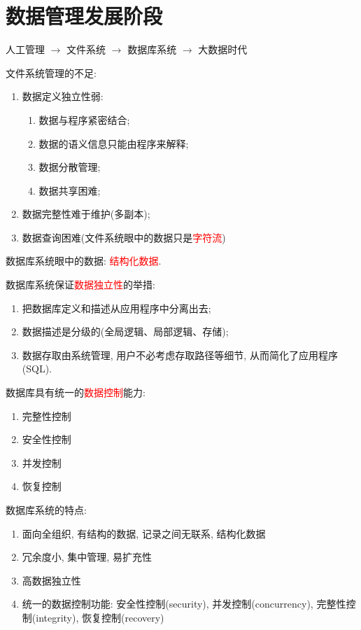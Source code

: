 \section{数据管理发展阶段}

人工管理 $\to$ 文件系统 $\to$ 数据库系统 $\to$ 大数据时代

文件系统管理的不足:
\begin{enumerate}
    \item 数据定义独立性弱:
    \begin{enumerate}
        \item 数据与程序紧密结合;
        \item 数据的语义信息只能由程序来解释;
        \item 数据分散管理;
        \item 数据共享困难;
    \end{enumerate}
    \item 数据完整性难于维护(多副本);
    \item 数据查询困难(文件系统眼中的数据只是\textcolor{red}{字符流})
\end{enumerate}

数据库系统眼中的数据: \textcolor{red}{结构化数据}.

数据库系统保证\textcolor{red}{数据独立性}的举措:
\begin{enumerate}
    \item 把数据库定义和描述从应用程序中分离出去;
    \item 数据描述是分级的(全局逻辑、局部逻辑、存储);
    \item 数据存取由系统管理, 用户不必考虑存取路径等细节, 从而简化了应用程序(SQL).
\end{enumerate}

数据库具有统一的\textcolor{red}{数据控制}能力:
\begin{enumerate}
    \item 完整性控制
    \item 安全性控制
    \item 并发控制
    \item 恢复控制
\end{enumerate}

数据库系统的特点:
\begin{enumerate}
    \item 面向全组织, 有结构的数据, 记录之间无联系, 结构化数据
    \item 冗余度小, 集中管理, 易扩充性
    \item 高数据独立性
    \item 统一的数据控制功能: 安全性控制(security), 并发控制(concurrency), 完整性控制(integrity), 恢复控制(recovery)
\end{enumerate}


